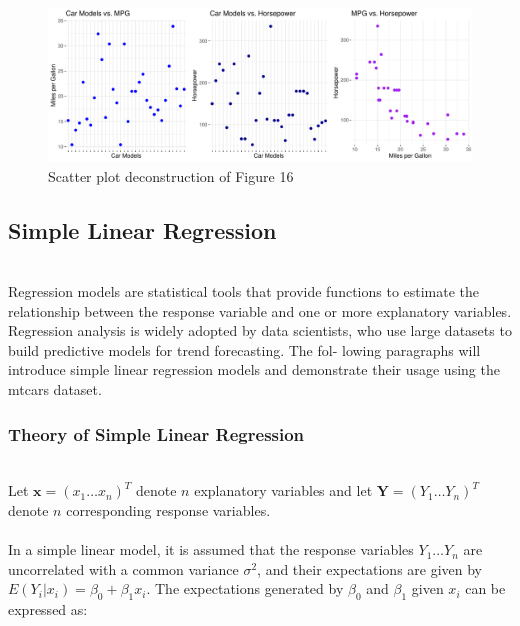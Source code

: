 \documentclass{article}\usepackage[]{graphicx}\usepackage[]{xcolor}
\makeatletter
\def\maxwidth{ %
  \ifdim\Gin@nat@width>\linewidth
    \linewidth
  \else
    \Gin@nat@width
  \fi
}
\newenvironment{knitrout}{}{} %
\numberwithin{equation}{section}
\makeatother
\begin{document}
\begin{knitrout}\scriptsize
{}\color{fgcolor}\begin{figure}[H]

{\centering \includegraphics[width=\maxwidth]{figure/beamer-bubble-plot-construction-1} 

}

\caption[Scatter plot deconstruction of Figure 16]{Scatter plot deconstruction of Figure 16}\label{fig:bubble-plot-construction}
\end{figure}

\end{knitrout}


\subsection{Simple Linear Regression}
\\Regression models are statistical tools that provide functions to estimate the relationship between the response variable and one or more explanatory variables. Regression analysis is widely adopted by data scientists, who use large datasets to build predictive models for trend forecasting. The fol- lowing paragraphs will introduce simple linear regression models and demonstrate their usage using the mtcars dataset.

\subsubsection{Theory of Simple Linear Regression} 

\\Let $\mathbf{x} = (x_1 \dots x_n)^T$ denote $n$ explanatory variables and let $\mathbf{Y} = (Y_1 \dots Y_n)^T$ denote $n$ corresponding response variables.
\\  
\\In a simple linear model, it is assumed that the response variables $Y_1 \dots Y_n$ are uncorrelated with a common variance $\sigma^2$, and their expectations are given by $E(Y_i| x_i) = \beta_0 + \beta_1 x_i$. The expectations generated by $\beta_0$ and $\beta_1$ given $x_i$ can be expressed as:
\end{document}
